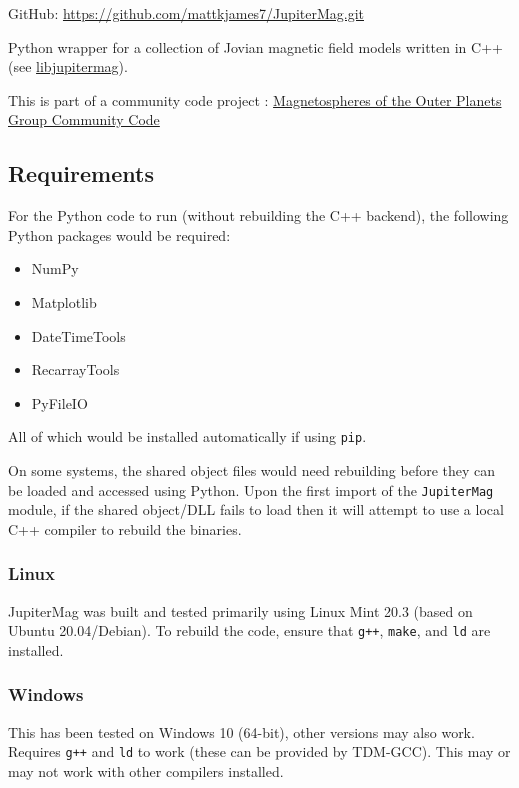 		GitHub: \href{https://github.com/mattkjames7/JupiterMag.git}{https://github.com/mattkjames7/JupiterMag.git}

		Python wrapper for a collection of Jovian magnetic field models written in C++ (see \href{https://github.com/mattkjames7/libjupitermag.git}{libjupitermag}).
	
		This is part of a community code project :
		\href{https://lasp.colorado.edu/home/mop/missions/juno/community-code/}{Magnetospheres of the Outer Planets Group Community Code}

	
	\subsection{Requirements}
	
		For the Python code to run (without rebuilding the C++ backend), the following Python packages would be required:
		
		\begin{itemize}
			\item NumPy
			\item Matplotlib
			\item DateTimeTools
			\item RecarrayTools
			\item PyFileIO
		\end{itemize}
	
		All of which would be installed automatically if using \texttt{pip}.
	
		On some systems, the shared object files would need rebuilding before they can be loaded and accessed using Python. Upon the first import of the \texttt{JupiterMag} module, if the shared object/DLL fails to load then it will attempt to use a local C++ compiler to rebuild the binaries.
	
	\subsubsection{Linux}
	
		JupiterMag was built and tested primarily using Linux Mint 20.3 (based on Ubuntu 20.04/Debian). To rebuild the code, ensure that \texttt{g++}, \texttt{make}, and \texttt{ld} are installed.
	
	\subsubsection{Windows}
	
		This has been tested on Windows 10 (64-bit), other versions may also work. Requires \texttt{g++} and \texttt{ld} to work (these can be provided by TDM-GCC). This may or may not work with other compilers installed.
	
